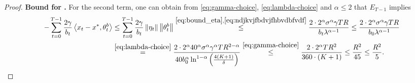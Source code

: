 \documentclass{article}
\begin{document}
\begin{proof}
    
    \textbf{Bound for \circledTwo.} For the second term, one can obtain from \eqref{eq:gamma-choice}, \eqref{eq:lambda-choice} and $\alpha \leq 2$ that $E_{T-1}$ implies
    \begin{align*}
        - \sum\limits_{t=0}^{T-1} \frac{2\gamma}{b_t}\left \langle x_t - x^*, \theta_t^b \right \rangle &\leq \sum\limits_{t=0}^{T-1} \frac{2\gamma}{b_t} \left\lVert\eta_t\right\rVert\left\lVert\theta^b_t\right\rVert \overset{\eqref{eq:bound_eta}, \eqref{eq:ndjkvjfbdvjfhbvdbfvdf}}{\leq} \frac{2 \cdot 2^\alpha\sigma^\alpha\gamma TR}{b_t \lambda^{\alpha-1}} \leq \frac{2 \cdot 2^\alpha\sigma^\alpha\gamma TR}{b_0 \lambda^{\alpha-1}}\\ 
        & \overset{\eqref{eq:lambda-choice}}{=} \frac{2 \cdot 2^\alpha 40^{\alpha}\sigma^\alpha\gamma^\alpha TR^{2 - \alpha}}{40b_0^\alpha \ln^{1 - \alpha}\left(\frac{4(K+1)}{\delta}\right)} \overset{\eqref{eq:gamma-choice}}{\leq} \frac{2 \cdot 2^\alpha TR^2}{360\cdot (K+1) } \leq  \frac{ R^2}{45} \leq \frac{R^2}{5}.
    \end{align*}
    

\end{proof}
\end{document}

